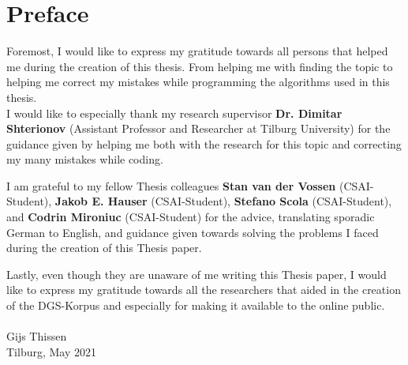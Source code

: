 
\section*{Preface}

Foremost, I would like to express my gratitude towards all persons that helped me during the creation of this thesis. From helping me with finding the topic to helping me correct my mistakes while programming the algorithms used in this thesis. 
\\

I would like to especially thank my research supervisor \textbf{Dr. Dimitar Shterionov} (Assistant Professor and Researcher at Tilburg University) for the guidance given by helping me both with the research for this topic and correcting my many mistakes while coding. 

I am grateful to my fellow Thesis colleagues \textbf{Stan van der Vossen} (CSAI-Student), \textbf{Jakob E. Hauser} (CSAI-Student), \textbf{Stefano Scola} (CSAI-Student), and \textbf{Codrin Mironiuc} (CSAI-Student) for the advice, translating sporadic German to English, and guidance given towards solving the problems I faced during the creation of this Thesis paper.

Lastly, even though they are unaware of me writing this Thesis paper, I would like to express my gratitude towards all the researchers that aided in the creation of the DGS-Korpus and especially for making it available to the online public. \\ \\
\hfill
Gijs Thissen \\
Tilburg, May 2021


